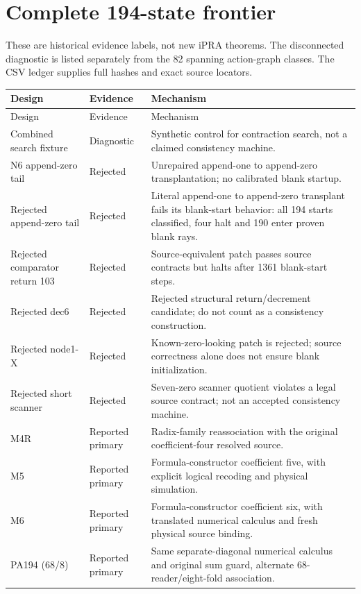 \section{Complete 194-state frontier}
These are historical evidence labels, not new iPRA theorems. The disconnected
diagnostic is listed separately from the 82 spanning action-graph classes.
The CSV ledger supplies full hashes and exact source locators.
\begingroup\small
\setlength{\tabcolsep}{3pt}
\begin{longtable}{@{}p{.25\linewidth}p{.17\linewidth}p{.53\linewidth}@{}}
\toprule
Design & Evidence & Mechanism \\
\midrule\endfirsthead
\toprule Design & Evidence & Mechanism \\
\midrule\endhead
\bottomrule\endfoot
Combined search fixture & Diagnostic & Synthetic control for contraction search, not a claimed consistency machine. \\
N6 append-zero tail & Rejected & Unrepaired append-one to append-zero transplantation; no calibrated blank startup. \\
Rejected append-zero tail & Rejected & Literal append-one to append-zero transplant fails its blank-start behavior: all 194 starts classified, four halt and 190 enter proven blank rays. \\
Rejected comparator return 103 & Rejected & Source-equivalent patch passes source contracts but halts after 1361 blank-start steps. \\
Rejected dec6 & Rejected & Rejected structural return/decrement candidate; do not count as a consistency construction. \\
Rejected node1-X & Rejected & Known-zero-looking patch is rejected; source correctness alone does not ensure blank initialization. \\
Rejected short scanner & Rejected & Seven-zero scanner quotient violates a legal source contract; not an accepted consistency machine. \\
M4R & Reported primary & Radix-family reassociation with the original coefficient-four resolved source. \\
M5 & Reported primary & Formula-constructor coefficient five, with explicit logical recoding and physical simulation. \\
M6 & Reported primary & Formula-constructor coefficient six, with translated numerical calculus and fresh physical source binding. \\
PA194 (68/8) & Reported primary & Same separate-diagonal numerical calculus and original sum guard, alternate 68-reader/eight-fold association. \\

\end{longtable}
